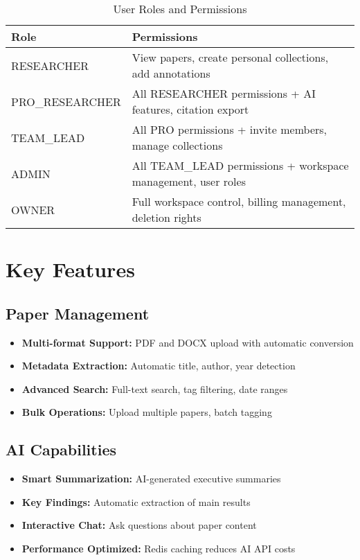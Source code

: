 \begin{table}[H]
\centering
\caption{User Roles and Permissions}
\label{tab:user-roles}
\begin{tabular}{@{}lp{9cm}@{}}
\toprule
\textbf{Role} & \textbf{Permissions} \\
\midrule
RESEARCHER & View papers, create personal collections, add annotations \\
PRO\_RESEARCHER & All RESEARCHER permissions + AI features, citation export \\
TEAM\_LEAD & All PRO permissions + invite members, manage collections \\
ADMIN & All TEAM\_LEAD permissions + workspace management, user roles \\
OWNER & Full workspace control, billing management, deletion rights \\
\bottomrule
\end{tabular}
\end{table}

\section{Key Features}
\label{sec:key-features}

\subsection{Paper Management}
\begin{itemize}[leftmargin=*]
    \item \textbf{Multi-format Support:} PDF and DOCX upload with automatic conversion
    \item \textbf{Metadata Extraction:} Automatic title, author, year detection
    \item \textbf{Advanced Search:} Full-text search, tag filtering, date ranges
    \item \textbf{Bulk Operations:} Upload multiple papers, batch tagging
\end{itemize}

\subsection{AI Capabilities}
\begin{itemize}[leftmargin=*]
    \item \textbf{Smart Summarization:} AI-generated executive summaries
    \item \textbf{Key Findings:} Automatic extraction of main results
    \item \textbf{Interactive Chat:} Ask questions about paper content
    \item \textbf{Performance Optimized:} Redis caching reduces AI API costs
\end{itemize}

